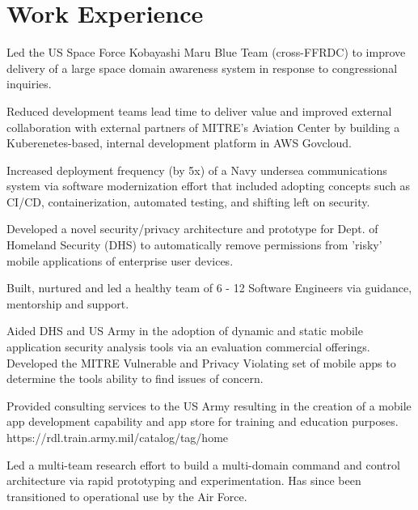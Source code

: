 \documentclass[]{deedy-resume-openfont}
\begin{document}
\section{Work Experience}
\hfill {}
\begin{tightemize}
	\item Led the US Space Force Kobayashi Maru Blue Team (cross-FFRDC) to improve delivery of a large space domain awareness system in response to congressional inquiries.   
	\item Reduced development teams lead time to deliver value and improved external collaboration with external partners of MITRE's Aviation Center by building a Kuberenetes-based, internal development platform in AWS Govcloud.  
    \item Increased deployment frequency (by 5x) of a Navy undersea communications system via software modernization effort that included adopting concepts such as CI/CD, containerization, automated testing, and shifting left on security.
    \item Developed a novel security/privacy architecture and prototype for Dept. of Homeland Security (DHS) to automatically remove permissions from 'risky' mobile applications of enterprise user devices.
\end{tightemize}
\sectionsep
{}\hfill {}
\begin{tightemize}
	\item Built, nurtured and led a healthy team of 6 - 12 Software Engineers via guidance, mentorship and support.
\end{tightemize}
\sectionsep
{}\hfill {}
\begin{tightemize}
	\item Aided DHS and US Army in the adoption of dynamic and static mobile application security analysis tools via an evaluation commercial offerings.  Developed the MITRE Vulnerable and Privacy Violating set of mobile apps to determine the tools ability to find issues of concern.
	\item Provided consulting services to the US Army resulting in the creation of a mobile app development capability and app store for training and education purposes.  https://rdl.train.army.mil/catalog/tag/home
    \item Led a multi-team research effort to build a multi-domain command and control architecture via rapid prototyping and experimentation. Has since been transitioned to operational use by the Air Force.
\end{tightemize}
\end{document}
